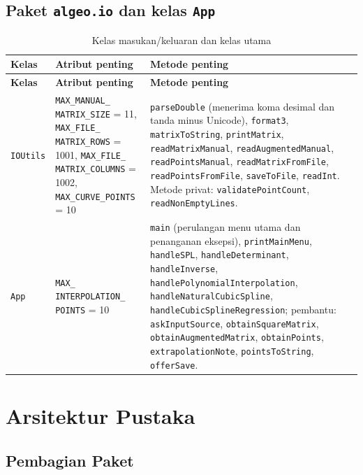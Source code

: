 \documentclass[12pt,a4paper]{report}
\begin{document}
\subsection{Paket \texttt{algeo.io} dan kelas \texttt{App}}

\begin{longtable}{L{2.5cm} L{3.9cm} L{8.1cm}}
\caption{Kelas masukan/keluaran dan kelas utama}\label{tab:kelas-io-app}\\
\toprule
\textbf{Kelas} & \textbf{Atribut penting} & \textbf{Metode penting} \\
\midrule
\endfirsthead
\toprule
\textbf{Kelas} & \textbf{Atribut penting} & \textbf{Metode penting} \\
\midrule
\endhead
\bottomrule
\endfoot
\texttt{IOUtils} &
\texttt{MAX\_MANUAL\_ \newline MATRIX\_SIZE} = 11, \texttt{MAX\_FILE\_ \newline MATRIX\_ROWS} = 1001,
\texttt{MAX\_FILE\_ \newline MATRIX\_COLUMNS} = 1002, \texttt{MAX\_CURVE\_POINTS} = 10 &
\texttt{parseDouble} (menerima koma desimal dan tanda minus Unicode),
\texttt{format3}, \texttt{matrixToString}, \texttt{printMatrix},
\texttt{readMatrixManual}, \texttt{readAugmentedManual},
\texttt{readPointsManual}, \texttt{readMatrixFromFile},
\texttt{readPointsFromFile}, \texttt{saveToFile}, \texttt{readInt}.
Metode privat: \texttt{validatePointCount}, \texttt{readNonEmptyLines}. \\
\addlinespace
\texttt{App} &
\texttt{MAX\_ \newline INTERPOLATION\_ \newline POINTS} = 10 &
\texttt{main} (perulangan menu utama dan penanganan eksepsi),
\texttt{printMainMenu}, \texttt{handleSPL}, \texttt{handleDeterminant},
\texttt{handleInverse}, \texttt{handlePolynomialInterpolation},
\texttt{handleNaturalCubicSpline}, \texttt{handleCubicSplineRegression};
pembantu: \texttt{askInputSource}, \texttt{obtainSquareMatrix},
\texttt{obtainAugmentedMatrix}, \texttt{obtainPoints},
\texttt{extrapolationNote}, \texttt{pointsToString}, \texttt{offerSave}. \\
\end{longtable}

\section{Arsitektur Pustaka}

\subsection{Pembagian Paket}
\end{document}
